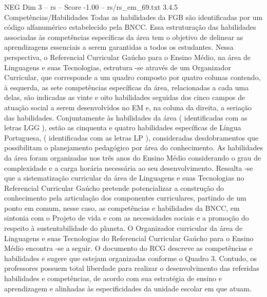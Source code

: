 \begin{textsample}{NEG Dim 3 – rs – Score -1.00 – rs/rs\_em\_69.txt}  \label{ex:f3_neg_043}
3.4.5 Competências/Habilidades Todas as habilidades da FGB são identificadas por um código alfanumérico estabelecido pela BNCC.
Essa estruturação das habilidades associadas às competências específicas da área tem o objetivo de delinear as aprendizagens essenciais a serem garantidas a todos os estudantes.
Nessa perspectiva, o Referencial Curricular Gaúcho para o Ensino Médio, na área de Linguagens e suas Tecnologias, estrutura -se através de um Organizador Curricular, que corresponde a um quadro composto por quatro colunas contendo, à esquerda, as sete competências específicas da área, relacionadas a cada uma delas, são indicadas as vinte e oito habilidades seguidas dos cinco campos de atuação social a serem desenvolvidos no EM e, na coluna da direita, a seriação das habilidades.
Conjuntamente às habilidades da área ( identificadas com as letras LGG ), estão as cinquenta e quatro habilidades específicas de Língua Portuguesa, ( identificadas com as letras LP ), consideradas desdobramentos que possibilitam o planejamento pedagógico por área do conhecimento.
As habilidades da área foram organizadas nos três anos do Ensino Médio considerando o grau de complexidade e a carga horária necessária ao seu desenvolvimento.
Ressalta -se que a sistematização curricular da área de Linguagens e suas Tecnologias no Referencial Curricular Gaúcho pretende potencializar a construção do conhecimento pela articulação dos componentes curriculares, partindo de um ponto em comum, nesse caso, as competências e habilidades da BNCC, em sintonia com o Projeto de vida e com as necessidades sociais e a promoção do respeito à sustentabilidade do planeta.
O Organizador curricular da área de Linguagens e suas Tecnologias do Referencial Curricular Gaúcho para o Ensino Médio encontra -se a seguir.
O documento do RCG descreve as competências e habilidades e sugere que estejam organizadas conforme o Quadro 3.
Contudo, os professores possuem total liberdade para realizar o desenvolvimento das referidas habilidades e competências, de acordo com sua estratégia de ensino e aprendizagem e alinhadas às especificidades da unidade escolar em que atuam.

\end{textsample}

